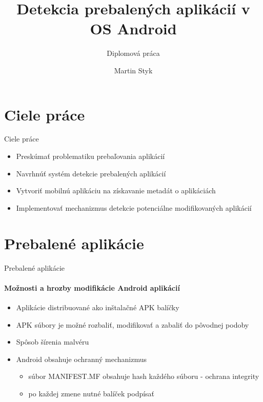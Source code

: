 \documentclass{beamer}
\title{Detekcia prebalených aplikácií v OS Android} %
\subtitle{Diplomová práca} %
\author{Martin Styk}
\begin{document}
  \frame{\maketitle}

\section{Ciele práce}
  \begin{frame}[label=lists]{Ciele práce}
    \begin{itemize}
    \item Preskúmať problematiku prebaľovania aplikácií
    \item Navrhnúť systém detekcie prebalených aplikácií
	\item Vytvoriť mobilnú aplikáciu na získavanie metadát o aplikáciách
	\item Implementovať mechanizmus detekcie potenciálne modifikovaných aplikácií
    \end{itemize}  
  \end{frame}
  
  \section{Prebalené aplikácie}
  \begin{frame}[label=lists]{Prebalené aplikácie}
 	 \framesubtitle{Možnosti a hrozby modifikácie Android aplikácií}
	\begin{itemize}
		\item Aplikácie distribuované ako inštalačné APK balíčky
	 	\item APK súbory je možné rozbaliť, modifikovať a zabaliť do pôvodnej podoby
  		\item Spôsob šírenia malvéru	  
	 	\item Android obsahuje ochranný mechanizmus
	 	 \begin{itemize}
	 	 	\item súbor MANIFEST.MF obsahuje hash každého súboru - ochrana 	integrity
	 	 	\item po každej zmene nutné balíček podpísať
		 \end{itemize}	 
	\end{itemize}
  \end{frame} 
  
\end{document}
